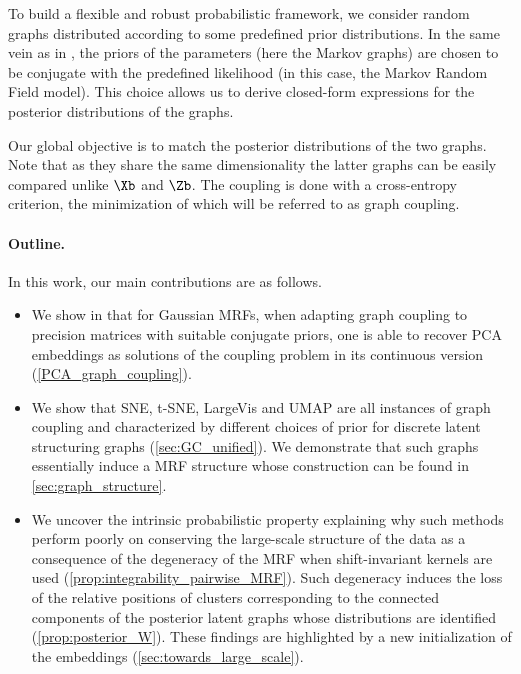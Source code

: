 To build a flexible and robust probabilistic framework, we consider random graphs distributed according to some predefined prior distributions. In the same vein as in , the priors of the parameters (here the Markov graphs) are chosen to be conjugate with the predefined likelihood (in this case, the Markov Random Field model). This choice allows us to derive closed-form expressions for the posterior distributions of the graphs.

Our global objective is to match the posterior distributions of the two graphs. Note that as they share the same dimensionality the latter graphs can be easily compared unlike $\Xb$ and $\Zb$. The coupling is done with a cross-entropy criterion, the minimization of which will be referred to as graph coupling.

\paragraph{Outline.} 

In this work, our main contributions are as follows.

\begin{itemize}
    \item We show in  that for Gaussian MRFs, when adapting graph coupling to precision matrices with suitable conjugate priors, one is able to recover PCA embeddings as solutions of the coupling problem in its continuous version (\cref{PCA_graph_coupling}).
    \item We show that SNE, t-SNE, LargeVis and UMAP are all instances of graph coupling and characterized by different choices of prior for discrete latent structuring graphs (\cref{sec:GC_unified}). We demonstrate that such graphs essentially induce a MRF structure whose construction can be found in \cref{sec:graph_structure}.
    \item We uncover the intrinsic probabilistic property explaining why such methods perform poorly on conserving the large-scale structure of the data as a consequence of the degeneracy of the MRF when shift-invariant kernels are used (\cref{prop:integrability_pairwise_MRF}). Such degeneracy induces the loss of the relative positions of clusters corresponding to the connected components of the posterior latent graphs whose distributions are identified (\cref{prop:posterior_W}). These findings are highlighted by a new initialization of the embeddings (\cref{sec:towards_large_scale}).
\end{itemize}
